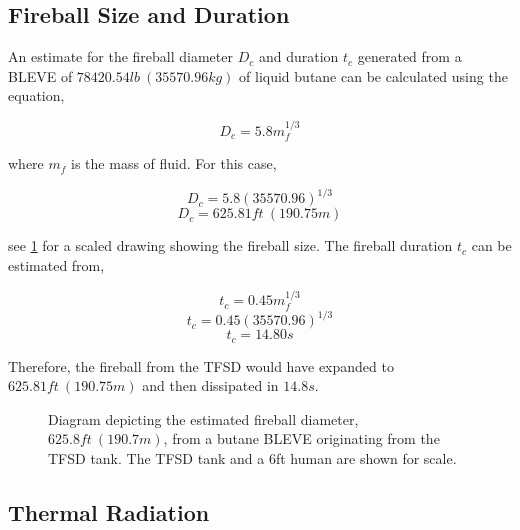 \documentclass[10pt,parskip=half,
toc=sectionentrywithdots,
bibliography=totocnumbered,
captions=tableheading,numbers=noendperiod]{scrartcl}
\begin{document}
\hypertarget{fireball-size-and-duration}{%
\subsection{Fireball Size and
Duration}\label{fireball-size-and-duration}}

An estimate for the fireball diameter \(D_c\) and duration \(t_c\)
generated from a BLEVE of \(78420.54lb\:(35570.96kg)\) of liquid butane
can be calculated using the equation,

\begin{equation}D_c = 5.8m_f^{1/3}\end{equation}

where \(m_f\) is the mass of fluid. For this case,

\begin{equation}D_c = 5.8(35570.96)^{1/3}\end{equation}
\begin{equation}D_c = 625.81ft\:(190.75m)\end{equation}

see \cref{fig:fig_fireball_dia} for a scaled drawing showing the
fireball size. The fireball duration \(t_c\) can be estimated from,

\begin{equation}t_c = 0.45m_f^{1/3}\end{equation}
\begin{equation}t_c = 0.45(35570.96)^{1/3}\end{equation}
\begin{equation}t_c = 14.80s\end{equation}

Therefore, the fireball from the TFSD would have expanded to
\(625.81ft\:(190.75m)\) and then dissipated in \(14.8s\).

\begin{figure}[H]
\hypertarget{fig:fig_fireball_dia}{%
\begin{center}
\end{center}
\caption{Diagram depicting the estimated fireball diameter,
\(625.8ft\:(190.7m)\), from a butane BLEVE originating from the TFSD
tank. The TFSD tank and a 6ft human are shown for scale.}\label{fig:fig_fireball_dia}
}
\end{figure}

\hypertarget{thermal-radiation}{%
\subsection{Thermal Radiation}\label{thermal-radiation}}
\end{document}
